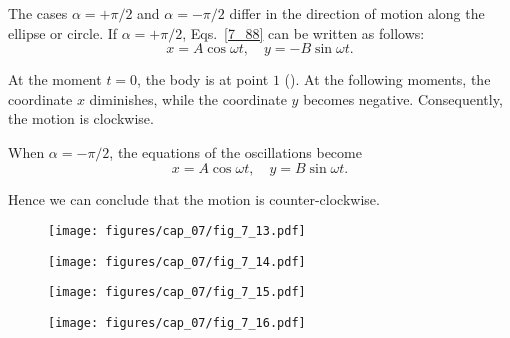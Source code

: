 \begin{enumerate}[1.]
	The cases $\alpha=+\pi/2$ and $\alpha=-\pi/2$ differ in the direction of motion along the ellipse or circle. If $\alpha=+\pi/2$, Eqs.~\eqref{7_88} can be written as follows:
	\begin{equation}\label{eq:7_95}
		x = A\cos\omega t,\quad y = -B\sin\omega t.
	\end{equation}
	
	\noindent
	At the moment $t=0$, the body is at point $1$ (). At the following moments, the coordinate $x$ diminishes, while the coordinate $y$ becomes negative. Consequently, the motion is clockwise.
	
	When $\alpha=-\pi/2$, the equations of the oscillations become
	\begin{equation}\label{eq:7_96}
		x = A\cos\omega t,\quad y = B\sin\omega t.
	\end{equation}
	
	\noindent
	Hence we can conclude that the motion is counter-clockwise.
\end{enumerate}

\begin{figure}[t]
	\begin{minipage}[t]{0.5\linewidth}
		\begin{center}
			\texttt{[image: figures/cap\_07/fig\_7\_13.pdf]}
			\caption[]{}
			\label{fig:7_13}
		\end{center}
	\end{minipage}
	\hspace{-0.0cm}
	\begin{minipage}[t]{0.5\linewidth}
		\begin{center}
			\texttt{[image: figures/cap\_07/fig\_7\_14.pdf]}
			\caption[]{}
			\label{fig:7_14}
		\end{center}
	\end{minipage}
	\vspace{-0.6cm}
\end{figure}

\begin{figure}[t]
	\begin{minipage}[t]{0.5\linewidth}
		\begin{center}
			\texttt{[image: figures/cap\_07/fig\_7\_15.pdf]}
			\caption[]{}
			\label{fig:7_15}
		\end{center}
	\end{minipage}
	\hspace{-0.0cm}
	\begin{minipage}[t]{0.5\linewidth}
		\begin{center}
			\texttt{[image: figures/cap\_07/fig\_7\_16.pdf]}
			\caption[]{}
			\label{fig:7_16}
		\end{center}
	\end{minipage}
	\vspace{-0.6cm}
\end{figure}

